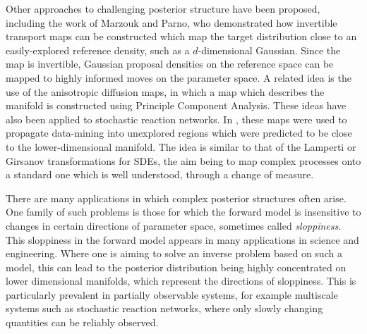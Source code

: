 \documentclass[final]{siamltex}
\newcommand{\edit}[1]{#1}
\begin{document}
Other approaches to challenging posterior structure have been
proposed, including the work of Marzouk and Parno\cite{parno2018transport}, who
demonstrated how invertible transport maps can be constructed which
map the target distribution close to an easily-explored reference
density, such as a $d$-dimensional Gaussian. Since the map is
invertible, Gaussian proposal densities on the reference space can be
mapped to highly informed moves on the parameter space. A related idea
is the use of the anisotropic diffusion maps\cite{singer2008non}, in
which a map which describes the manifold is constructed using
Principle Component Analysis. These ideas have also been applied to
stochastic reaction
networks\cite{singer2009detecting,dsilva2016data}. In
\cite{chiavazzo2017intrinsic}, these maps were used to propagate
data-mining into unexplored regions which were predicted to be close
to the lower-dimensional manifold. The idea is similar to that of the
Lamperti or Girsanov transformations for SDEs\cite{flandrin2003stationarity,gardiner2009stochastic},  the aim being to map complex
processes onto a standard one which is well understood, through a
change of measure.

\edit{
There are many applications in which complex posterior structures
often arise. One family of such problems is those for which the
forward model is insensitive to changes in certain directions of
parameter space, sometimes called
\emph{sloppiness}\cite{gutenkunst2007universally,apgar2010sloppy}. This
sloppiness in the forward model appears in many applications in
science and engineering\cite{constantine2014active}. Where one is
aiming to solve an inverse problem based on such a model, this can
lead to the posterior distribution being highly concentrated on lower
dimensional manifolds, which represent the directions of
sloppiness. This is particularly prevalent in partially observable
systems, for example multiscale systems such
as stochastic reaction networks, where only slowly changing quantities
can be reliably observed.}



\end{document}

